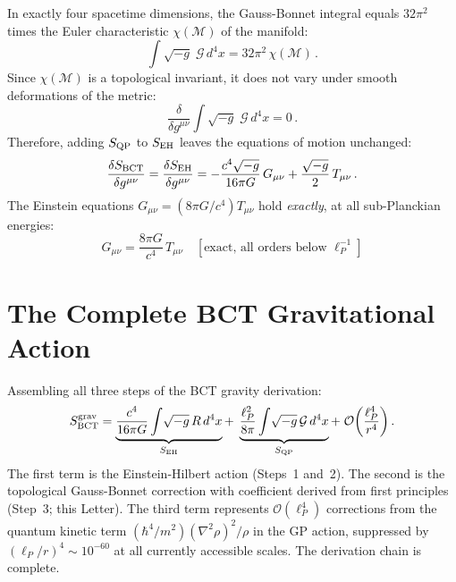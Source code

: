 \documentclass[twocolumn,10pt,a4paper]{article}
\begin{document}
In exactly four spacetime dimensions, the Gauss-Bonnet integral equals
$32\pi^2$ times the Euler characteristic $\chi(\mathcal{M})$ of the
manifold:
\begin{equation}
  \int\!\sqrt{-g}\;\mathcal{G}\,d^4x = 32\pi^2\,\chi(\mathcal{M})\,.
  \label{eq:GB_topological}
\end{equation}
Since $\chi(\mathcal{M})$ is a topological invariant, it does not vary
under smooth deformations of the metric:
\begin{equation}
  \frac{\delta}{\delta g^{\mu\nu}}
  \int\!\sqrt{-g}\;\mathcal{G}\,d^4x = 0\,.
  \label{eq:GB_zero_variation}
\end{equation}
Therefore, adding $S_{\rm QP}$ to $S_{\rm EH}$ leaves the equations of
motion unchanged:
\begin{equation}
  \frac{\delta S_{\rm BCT}}{\delta g^{\mu\nu}}
  = \frac{\delta S_{\rm EH}}{\delta g^{\mu\nu}}
  = -\frac{c^4\sqrt{-g}}{16\pi G}\,G_{\mu\nu}
  + \frac{\sqrt{-g}}{2}\,T_{\mu\nu}\,.
\end{equation}
The Einstein equations $G_{\mu\nu} = (8\pi G/c^4)T_{\mu\nu}$ hold
\textit{exactly}, at all sub-Planckian energies:
\begin{equation}
  \boxed{G_{\mu\nu} = \frac{8\pi G}{c^4}\,T_{\mu\nu}
  \quad [\text{exact, all orders below } \ell_P^{-1}]}
  \label{eq:Einstein_exact}
\end{equation}

\section*{The Complete BCT Gravitational Action}

Assembling all three steps of the BCT gravity derivation:
\begin{equation}
  S_{\rm BCT}^{\rm grav} =
  \underbrace{\frac{c^4}{16\pi G}\int\!\sqrt{-g}\,R\,d^4x}_{S_{\rm EH}}
  +\; \underbrace{\frac{\ell_P^2}{8\pi}\int\!\sqrt{-g}\,\mathcal{G}\,d^4x}_{S_{\rm QP}}
  +\; \mathcal{O}\!\left(\frac{\ell_P^4}{r^4}\right).
  \label{eq:SBCT_full}
\end{equation}
The first term is the Einstein-Hilbert action (Steps~1 and~2). The
second is the topological Gauss-Bonnet correction with coefficient
derived from first principles (Step~3; this Letter). The third term
represents $\mathcal{O}(\ell_P^4)$ corrections from the quantum
kinetic term $(\hbar^4/m^2)(\nabla^2\rho)^2/\rho$ in the GP action,
suppressed by $(\ell_P/r)^4 \sim 10^{-60}$ at all currently accessible
scales. The derivation chain is complete.
\end{document}
